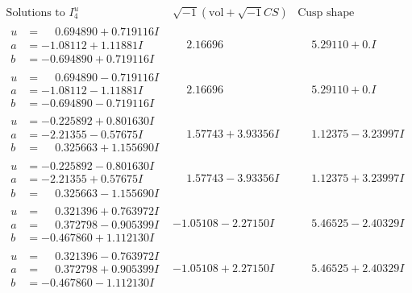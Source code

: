 \documentclass[1p]{elsarticle_modified}
\theoremstyle{definition}
\newcommand{\I}{\sqrt{-1}}
\begin{document}
$$\begin{array}{c|c|c}  
\text{Solutions to }I^u_{4}& \I (\text{vol} + \sqrt{-1}CS) & \text{Cusp shape}\\
 \hline 
\begin{aligned}
u &= \phantom{-}0.694890 + 0.719116 I \\
a &= -1.08112 + 1.11881 I \\
b &= -0.694890 + 0.719116 I\end{aligned}
 & \phantom{-}2.16696\phantom{ +0.000000I} & \phantom{-}5.29110 + 0. I\phantom{ +0.000000I} \\ \hline\begin{aligned}
u &= \phantom{-}0.694890 - 0.719116 I \\
a &= -1.08112 - 1.11881 I \\
b &= -0.694890 - 0.719116 I\end{aligned}
 & \phantom{-}2.16696\phantom{ +0.000000I} & \phantom{-}5.29110 + 0. I\phantom{ +0.000000I} \\ \hline\begin{aligned}
u &= -0.225892 + 0.801630 I \\
a &= -2.21355 - 0.57675 I \\
b &= \phantom{-}0.325663 + 1.155690 I\end{aligned}
 & \phantom{-}1.57743 + 3.93356 I & \phantom{-}1.12375 - 3.23997 I \\ \hline\begin{aligned}
u &= -0.225892 - 0.801630 I \\
a &= -2.21355 + 0.57675 I \\
b &= \phantom{-}0.325663 - 1.155690 I\end{aligned}
 & \phantom{-}1.57743 - 3.93356 I & \phantom{-}1.12375 + 3.23997 I \\ \hline\begin{aligned}
u &= \phantom{-}0.321396 + 0.763972 I \\
a &= \phantom{-}0.372798 - 0.905399 I \\
b &= -0.467860 + 1.112130 I\end{aligned}
 & -1.05108 - 2.27150 I & \phantom{-}5.46525 - 2.40329 I \\ \hline\begin{aligned}
u &= \phantom{-}0.321396 - 0.763972 I \\
a &= \phantom{-}0.372798 + 0.905399 I \\
b &= -0.467860 - 1.112130 I\end{aligned}
 & -1.05108 + 2.27150 I & \phantom{-}5.46525 + 2.40329 I \\ \hline\begin{aligned}

\end{aligned}
\end{array}$$
\end{document}
